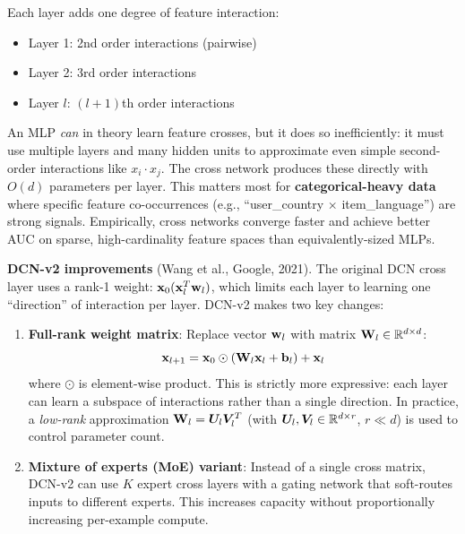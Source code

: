 Each layer adds one degree of feature interaction:
\begin{itemize}
    \item Layer 1: 2nd order interactions (pairwise)
    \item Layer 2: 3rd order interactions
    \item Layer $l$: $(l+1)$th order interactions
\end{itemize}

\begin{keyinsight}
An MLP \textit{can} in theory learn feature crosses, but it does so inefficiently: it must use multiple layers and many hidden units to approximate even simple second-order interactions like $x_i \cdot x_j$. The cross network produces these directly with $O(d)$ parameters per layer. This matters most for \textbf{categorical-heavy data} where specific feature co-occurrences (e.g., ``user\_country $\times$ item\_language'') are strong signals. Empirically, cross networks converge faster and achieve better AUC on sparse, high-cardinality feature spaces than equivalently-sized MLPs.
\end{keyinsight}

\textbf{DCN-v2 improvements} (Wang et al., Google, 2021). The original DCN cross layer uses a rank-1 weight: $\mathbf{x}_0 (\mathbf{x}_l^T \mathbf{w}_l)$, which limits each layer to learning one ``direction'' of interaction per layer. DCN-v2 makes two key changes:
\begin{enumerate}
    \item \textbf{Full-rank weight matrix}: Replace vector $\mathbf{w}_l$ with matrix $\mathbf{W}_l \in \mathbb{R}^{d \times d}$:
    \begin{equation}
    \mathbf{x}_{l+1} = \mathbf{x}_0 \odot (\mathbf{W}_l \mathbf{x}_l + \mathbf{b}_l) + \mathbf{x}_l
    \end{equation}
    where $\odot$ is element-wise product. This is strictly more expressive: each layer can learn a subspace of interactions rather than a single direction. In practice, a \textit{low-rank} approximation $\mathbf{W}_l = \bm{U}_l \bm{V}_l^T$ (with $\bm{U}_l, \bm{V}_l \in \mathbb{R}^{d \times r}$, $r \ll d$) is used to control parameter count.
    \item \textbf{Mixture of experts (MoE) variant}: Instead of a single cross matrix, DCN-v2 can use $K$ expert cross layers with a gating network that soft-routes inputs to different experts. This increases capacity without proportionally increasing per-example compute.
\end{enumerate}

